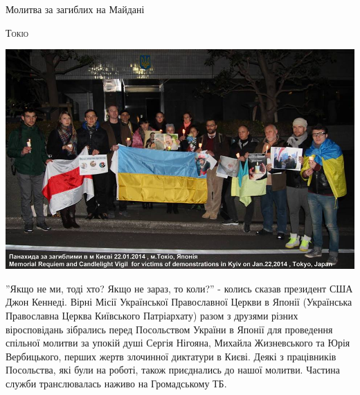 \documentclass[10pt,a4paper]{article}
\newcommand{\NewsItem}[1]{%
		\usefont{T2A}{iwona}{m}{n} 
		\large #1 \vspace{4pt}
		\par \normalsize \normalfont}
\newcommand{\NewsAuthor}[1]{%
			\hfill \textsc{#1} \vspace{4pt}
			\par \normalfont}
\begin{document}
\begin{multicols}{3}
\vspace{1cm}
\NewsItem{Молитва за загиблих на Майдані}
\NewsAuthor{Токіо}
		\begin{center}
			\includegraphics[width=0.8\linewidth]{images/molytva-za-zagyblyh}
		\end{center}
''Якщо не ми, тоді хто? Якщо не зараз, то коли?'' - колись сказав президент США Джон Кеннеді. Вірні Місії Української Православної Церкви в Японії (Українська Православна Церква Київського Патріархату) разом з друзями різних віросповідань зібрались перед Посольством України в Японії для проведення спільної молитви за упокій душі Сергія Нігояна, Михайла Жизневського та Юрія Вербицького, перших жертв злочинної диктатури в Києві. Деякі з працівників Посольства, які були на роботі, також приєднались до нашої молитви. Частина служби транслювалась наживо на Громадському ТБ.

\end{multicols}

\newpage
\end{document}
